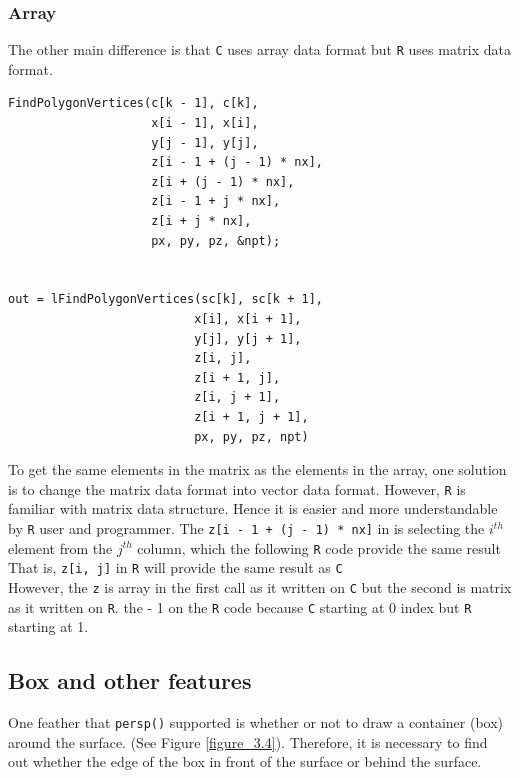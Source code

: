 \documentclass{report}
\begin{document}
\subsubsection{Array}
The other main difference is that \texttt{C} uses array data format but \texttt{R} uses matrix data format. 
\begin{lstlisting}
FindPolygonVertices(c[k - 1], c[k],
                    x[i - 1], x[i],
                    y[j - 1], y[j],
                    z[i - 1 + (j - 1) * nx],
                    z[i + (j - 1) * nx],
                    z[i - 1 + j * nx],
                    z[i + j * nx],
                    px, py, pz, &npt);


out = lFindPolygonVertices(sc[k], sc[k + 1],
                          x[i], x[i + 1],
                          y[j], y[j + 1],
                          z[i, j],
                          z[i + 1, j],
                          z[i, j + 1],
                          z[i + 1, j + 1],
                          px, py, pz, npt)
\end{lstlisting}



To get the same elements in the matrix as the elements in the array, one solution is to change the matrix data format into vector data format. However, \texttt{R} is familiar with matrix data structure. Hence it is easier and more understandable by \texttt{R} user and programmer. The \texttt{z[i - 1 + (j - 1) * nx]} in  is selecting the $i^{th}$ element from the $j^{th}$ column, which the following \texttt{R} code provide the same result That is, \texttt{z[i, j]} in \texttt{R} will provide the same result as \texttt{C} \\

However, the \texttt{z} is array in the first call as it written on \texttt{C} but the second is matrix as it written on \texttt{R}. the - 1 on the \texttt{R} code because \texttt{C} starting at 0 index but \texttt{R} starting at 1.\\

\subsection{Box and other features}
One feather that \texttt{persp()} supported is whether or not to draw a container (box) around the surface. (See Figure \ref{figure_3.4}). Therefore, it is necessary to find out whether the edge of the box in front of the surface or behind the surface. \\ 
\end{document}

